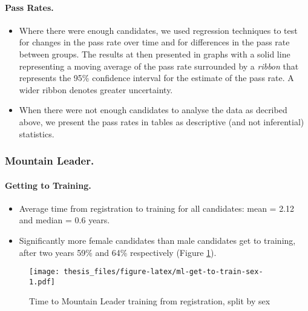 \documentclass[
  12pt,
  a4paper,
]{book}
\providecommand{\tightlist}{%
  \setlength{\itemsep}{0pt}\setlength{\parskip}{0pt}}
\begin{document}
\hypertarget{mts-part-a-pass-rates}{%
\paragraph{Pass Rates.}\label{mts-part-a-pass-rates}}

\begin{itemize}
\tightlist
\item
  Where there were enough candidates, we used regression techniques to test for changes in the pass rate over time and for differences in the pass rate between groups. The results at then presented in graphs with a solid line representing a moving average of the pass rate surrounded by a \emph{ribbon} that represents the 95\% confidence interval for the estimate of the pass rate. A wider ribbon denotes greater uncertainty.
\item
  When there were not enough candidates to analyse the data as decribed above, we present the pass rates in tables as descriptive (and not inferential) statistics.
\end{itemize}

\newpage

\hypertarget{mts-part-a-mountain-leader}{%
\subsubsection{Mountain Leader.}\label{mts-part-a-mountain-leader}}

\hypertarget{mts-part-a-getting-to-training-ml}{%
\paragraph{Getting to Training.}\label{mts-part-a-getting-to-training-ml}}

\begin{itemize}
\tightlist
\item
  Average time from registration to training for all candidates: mean = 2.12 and median = 0.6 years.
\item
  Significantly more female candidates than male candidates get to training, after two years 59\% and 64\% respectively (Figure \ref{fig:ml-get-to-train-sex}).
\end{itemize}

\begin{figure}
\centering
\texttt{[image: thesis\_files/figure-latex/ml-get-to-train-sex-1.pdf]}
\caption{\label{fig:ml-get-to-train-sex}Time to Mountain Leader training from registration, split by sex}
\end{figure}
\end{document}
